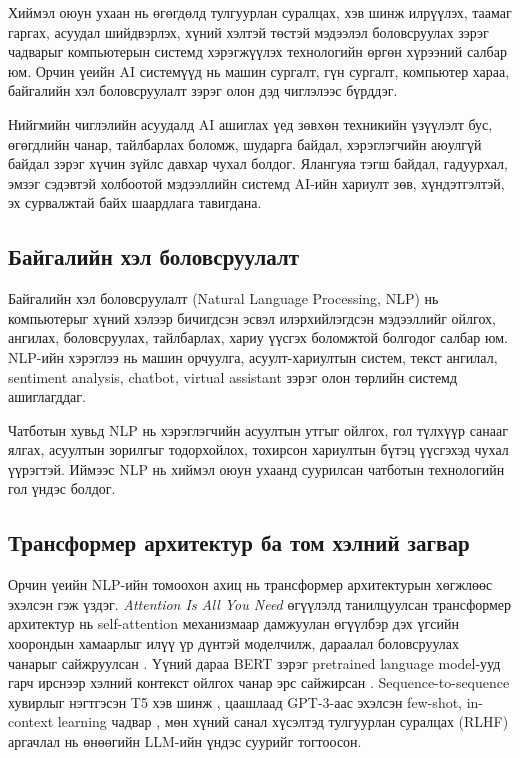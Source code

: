 Хиймэл оюун ухаан нь өгөгдөлд тулгуурлан суралцах, хэв шинж илрүүлэх, таамаг гаргах, асуудал шийдвэрлэх, хүний хэлтэй төстэй мэдээлэл боловсруулах зэрэг чадварыг компьютерын системд хэрэгжүүлэх технологийн өргөн хүрээний салбар юм. Орчин үеийн AI системүүд нь машин сургалт, гүн сургалт, компьютер хараа, байгалийн хэл боловсруулалт зэрэг олон дэд чиглэлээс бүрддэг.

Нийгмийн чиглэлийн асуудалд AI ашиглах үед зөвхөн техникийн үзүүлэлт бус, өгөгдлийн чанар, тайлбарлах боломж, шударга байдал, хэрэглэгчийн аюулгүй байдал зэрэг хүчин зүйлс давхар чухал болдог. Ялангуяа тэгш байдал, гадуурхал, эмзэг сэдэвтэй холбоотой мэдээллийн системд AI-ийн хариулт зөв, хүндэтгэлтэй, эх сурвалжтай байх шаардлага тавигдана.

\subsection{Байгалийн хэл боловсруулалт}

Байгалийн хэл боловсруулалт (Natural Language Processing, NLP) нь компьютерыг хүний хэлээр бичигдсэн эсвэл илэрхийлэгдсэн мэдээллийг ойлгох, ангилах, боловсруулах, тайлбарлах, хариу үүсгэх боломжтой болгодог салбар юм. NLP-ийн хэрэглээ нь машин орчуулга, асуулт-хариултын систем, текст ангилал, sentiment analysis, chatbot, virtual assistant зэрэг олон төрлийн системд ашиглагддаг.

Чатботын хувьд NLP нь хэрэглэгчийн асуултын утгыг ойлгох, гол түлхүүр санааг ялгах, асуултын зорилгыг тодорхойлох, тохирсон хариултын бүтэц үүсгэхэд чухал үүрэгтэй. Иймээс NLP нь хиймэл оюун ухаанд суурилсан чатботын технологийн гол үндэс болдог.

\subsection{Трансформер архитектур ба том хэлний загвар}

Орчин үеийн NLP-ийн томоохон ахиц нь трансформер архитектурын хөгжлөөс эхэлсэн гэж үздэг. \textit{Attention Is All You Need} өгүүлэлд танилцуулсан трансформер архитектур нь self-attention механизмаар дамжуулан өгүүлбэр дэх үгсийн хоорондын хамаарлыг илүү үр дүнтэй моделчилж, дараалал боловсруулах чанарыг сайжруулсан \cite{vaswani2017}. Үүний дараа BERT зэрэг pretrained language model-ууд гарч ирснээр хэлний контекст ойлгох чанар эрс сайжирсан \cite{bert2019}. Sequence-to-sequence хувирлыг нэгтгэсэн T5 хэв шинж \cite{t5}, цаашлаад GPT-3-аас эхэлсэн few-shot, in-context learning чадвар \cite{gpt3}, мөн хүний санал хүсэлтэд тулгуурлан суралцах (RLHF) аргачлал \cite{instruct_gpt} нь өнөөгийн LLM-ийн үндэс суурийг тогтоосон.

